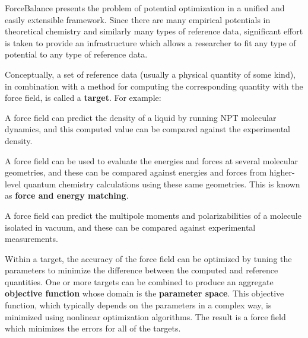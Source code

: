Force\-Balance presents the problem of potential optimization in a unified and easily extensible framework. Since there are many empirical potentials in theoretical chemistry and similarly many types of reference data, significant effort is taken to provide an infrastructure which allows a researcher to fit any type of potential to any type of reference data.

Conceptually, a set of reference data (usually a physical quantity of some kind), in combination with a method for computing the corresponding quantity with the force field, is called a {\bfseries target}. For example\-:


\begin{DoxyItemize}
\item A force field can predict the density of a liquid by running N\-P\-T molecular dynamics, and this computed value can be compared against the experimental density.
\end{DoxyItemize}


\begin{DoxyItemize}
\item A force field can be used to evaluate the energies and forces at several molecular geometries, and these can be compared against energies and forces from higher-\/level quantum chemistry calculations using these same geometries. This is known as {\bfseries force and energy matching}.
\end{DoxyItemize}


\begin{DoxyItemize}
\item A force field can predict the multipole moments and polarizabilities of a molecule isolated in vacuum, and these can be compared against experimental measurements.
\end{DoxyItemize}

Within a target, the accuracy of the force field can be optimized by tuning the parameters to minimize the difference between the computed and reference quantities. One or more targets can be combined to produce an aggregate {\bfseries objective function} whose domain is the {\bfseries parameter space}. This objective function, which typically depends on the parameters in a complex way, is minimized using nonlinear optimization algorithms. The result is a force field which minimizes the errors for all of the targets.


